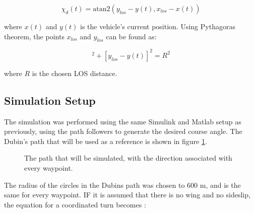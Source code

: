 \begin{equation}
	\chi_d(t) = \text{atan2}(y_{los} - y(t), x_{los} - x(t))
\end{equation}

where $x(t)$ and $y(t)$ is the vehicle's current position. Using Pythagoras theorem, the points $x_{los}$ and $y_{los}$ can be found as:

\begin{equation}
	[x_{los} - x(t)]^2 + [y_{los} - y(t)]^2 = R^2
\end{equation}

where $R$ is the chosen LOS distance.


\subsection{Simulation Setup}

The simulation was performed using the same Simulink and Matlab setup as previously, using the path followers to generate the desired course angle. The Dubin's path that will be used as a reference is shown in figure \ref{fig:dubins_reference}.

\begin{figure}[!ht]
    \centering
    \caption{The path that will be simulated, with the direction associated with every waypoint.}
	\label{fig:dubins_reference}
\end{figure}

The radius of the circles in the Dubins path was chosen to $600$ m, and is the same for every waypoint. IF it is assumed that there is no wing and no sideslip, the equation for a coordinated turn becomes \cite{suaBEARD}:

